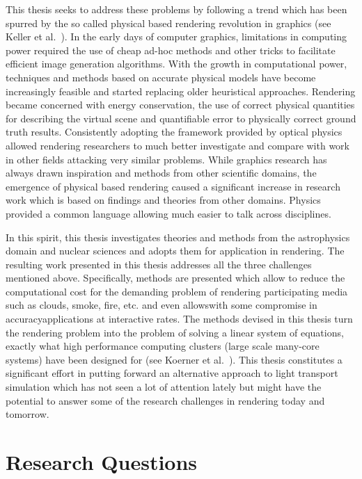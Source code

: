 This thesis seeks to address these problems by following a trend which has been spurred by the so called physical based rendering revolution in graphics (see Keller et al.~\cite{Keller15}). In the early days of computer graphics, limitations in computing power required the use of cheap ad-hoc methods and other tricks to facilitate efficient image generation algorithms. With the growth in computational power, techniques and methods based on accurate physical models have become increasingly feasible and started replacing older heuristical approaches. Rendering became concerned with energy conservation, the use of correct physical quantities for describing the virtual scene and quantifiable error to physically correct ground truth results. Consistently adopting the framework provided by optical physics allowed rendering researchers to much better investigate and compare with work in other fields attacking very similar problems. While graphics research has always drawn inspiration and methods from other scientific domains, the emergence of physical based rendering caused a significant increase in research work which is based on findings and theories from other domains. Physics provided a common language allowing much easier to talk across disciplines.

In this spirit, this thesis investigates theories and methods from the astrophysics domain and nuclear sciences and adopts them for application in rendering. The resulting work presented in this thesis addresses all the three challenges mentioned above. Specifically, methods are presented which allow to reduce the computational cost for the demanding problem of rendering participating media such as clouds, smoke, fire, etc. and even allows\mydash with some compromise in accuracy\mydash applications at interactive rates. The methods devised in this thesis turn the rendering problem into the problem of solving a linear system of equations, exactly what high performance computing clusters (large scale many-core systems) have been designed for (see Koerner et al.~\cite{Koerner17}). This thesis constitutes a significant effort in putting forward an alternative approach to light transport simulation which has not seen a lot of attention lately but might have the potential to answer some of the research challenges in rendering today and tomorrow.


\section{Research Questions}

